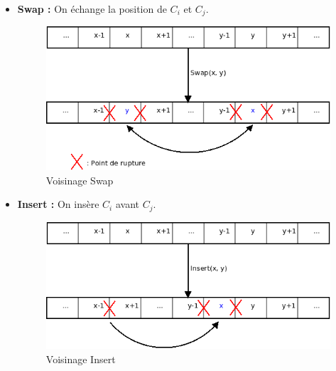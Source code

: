 \documentclass[a4paper,10pt]{report}
\begin{document}
\begin{itemize}
  \item \textbf{Swap :} On échange la position de $C_i$ et $C_j$.
  \begin{figure}[H]
    \begin{center}
      \includegraphics[width=\textwidth]{images/Swap.png}
    \end{center}
    \caption{Voisinage Swap}
  \end{figure}

  \item \textbf{Insert :} On insère $C_i$ avant $C_j$.
  \begin{figure}[H]
    \begin{center}
      \includegraphics[width=\textwidth]{images/Insert.png}
    \end{center}
    \caption{Voisinage Insert}
  \end{figure}


\end{itemize}
\end{document}
